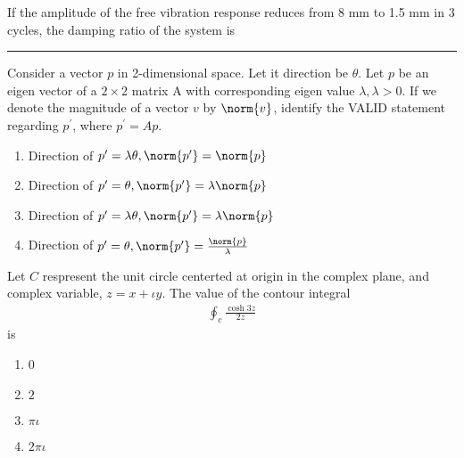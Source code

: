 	If the amplitude of the free vibration response reduces from 8 mm to 1.5 mm in 3 cycles, the damping ratio of the system is \rule{1cm}{0.1pt} 

		\hfill{}

\item Consider a vector $p$ in 2-dimensional space. Let it direction  be $\theta$. Let $p$ be an eigen vector of a $2 \times 2$ matrix A with corresponding eigen value $\lambda, \lambda > 0$. If we denote the magnitude of a vector $v$ by $\norm{v}$, identify the VALID statement regarding $p^{\prime}$, where $p^{\prime} = Ap$.
		
		\hfill{}
		
		\begin{enumerate}
			\item Direction of $p^{\prime} = \lambda \theta, \norm{p^{\prime}} = \norm{p}$
			\item Direction of $p^{\prime} = \theta, \norm{p^{\prime}} = \lambda \norm{p}$
			\item Direction of $p^{\prime} = \lambda \theta, \norm{p^{\prime}} = \lambda \norm{p}$
			\item Direction of $p^{\prime} = \theta, \norm{p^{\prime}} = \frac{\norm{p}}{\lambda}$
		\end{enumerate}

	\item Let $C$ respresent the unit circle centerted at origin in the complex plane, and complex variable, $ z = x + \iota y$. The value of the contour integral 
		\begin{align*}
			\oint_{c} \frac{\cosh{3z}}{2z} 
		\end{align*}
	 is

		\hfill{}

		\begin{multicols}{4}
			\begin{enumerate}
				\item 0 
				\item $2$
				\item $\pi\iota$
				\item $2\pi\iota$
			\end{enumerate}
		\end{multicols}

